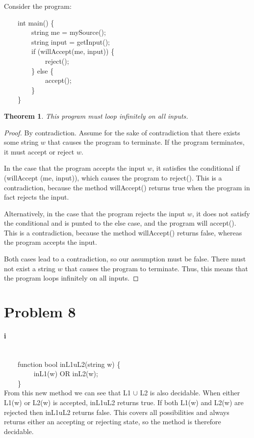 \documentclass[10pt,letter]{article}
\newtheorem*{thm}{Theorem}
\begin{document}
Consider the program:
{\selectfont

$\qquad$int main() \{\\
$\qquad$$\qquad$string me = mySource();\\
$\qquad$$\qquad$string input = getInput();\\
$\qquad$$\qquad$if (willAccept(me, input)) \{\\
$\qquad$$\qquad$$\qquad$reject();\\
$\qquad$$\qquad$\} else \{\\
$\qquad$$\qquad$$\qquad$accept();\\
$\qquad$$\qquad$\}\\
$\qquad$\}
}
\begin{thm}This program must loop infinitely on all inputs.\end{thm}
\begin{proof}
By contradiction. Assume for the sake of contradiction that there exists some string $w$ that causes the program to terminate. If the program terminates, it must accept or reject $w$. 

In the case that the program accepts the input $w$, it satisfies the conditional {\selectfont if (willAccept (me, input))}, which causes the program to {\selectfont reject()}. This is a contradiction, because the method {\selectfont willAccept()} returns true when the program in fact rejects the input.

Alternatively, in the case that the program rejects the input $w$, it does not satisfy the conditional and is punted to the {\selectfont else} case, and the program will {\selectfont accept()}. This is a contradiction, because the method {\selectfont willAccept()} returns false, whereas the program accepts the input.

Both cases lead to a contradiction, so our assumption must be false. There must not exist a string $w$ that causes the program to terminate. Thus, this means that the program loops infinitely on all inputs. 
\end{proof}
\section*{Problem 8}
\paragraph{i}
\ \\
{\selectfont
$\qquad$function bool inL1uL2(string w) \{ \\
$\qquad$$\qquad$  inL1(w) OR inL2(w); \\
$\qquad$\} \\}
From this new method we can see that L1 $\cup$ L2 is also decidable. When either L1(w) or L2(w) is accepted, inL1uL2 returns true. If both L1(w) and L2(w) are rejected then inL1uL2 returns false. This covers all possibilities and always returns either an accepting or rejecting state, so the method is therefore decidable. 
\end{document}
